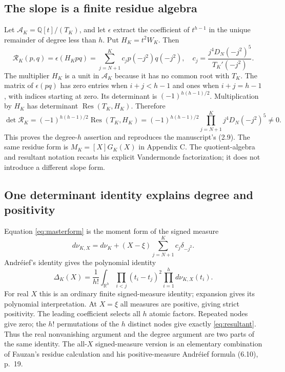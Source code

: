 \documentclass[11pt]{article}
\theoremstyle{definition}
\theoremstyle{remark}\newtheorem*{remark}{Remark}
\newcommand{\Q}{\mathbb Q}
\newcommand{\R}{\mathbb R}
\newcommand{\Res}{\operatorname{Res}}
\newcommand{\rpair}{\mathcal R}
\begin{document}
\subsection{The slope is a finite residue algebra}
Let $\mathcal A_K=\Q[t]/(T_K)$, and let $\epsilon$ extract the coefficient of
$t^{h-1}$ in the unique remainder of degree less than $h$. Put $H_K=t^2W_K$.
Then
\begin{equation}\label{eq:frobenius}
 \rpair_K(p,q)=\epsilon(H_Kpq)
 =\sum_{j=N+1}^K c_jp(-j^2)q(-j^2),\quad
 c_j=\frac{j^4D_N(-j^2)^5}{T_K'(-j^2)}.
\end{equation}
The multiplier $H_K$ is a unit in $\mathcal A_K$ because it has no common root
with $T_K$. The matrix of $\epsilon(pq)$ has zero entries when $i+j<h-1$
and ones when $i+j=h-1$, with indices starting at zero. Its determinant is
$(-1)^{h(h-1)/2}$. Multiplication by $H_K$ has determinant
$\Res(T_K,H_K)$. Therefore
\begin{equation}\label{eq:resultant}
 \det\rpair_K=(-1)^{h(h-1)/2}\Res(T_K,H_K)
 =(-1)^{h(h-1)/2}\prod_{j=N+1}^K j^4D_N(-j^2)^5\ne0.
\end{equation}
This proves the degree-$h$ assertion and reproduces the manuscript's (2.9).
The same residue form is $M_K=[X]G_K(X)$ in Appendix C.
The quotient-algebra and resultant notation recasts his explicit
Vandermonde factorization; it does not introduce a different slope form.

\subsection{One determinant identity explains degree and positivity}
Equation \eqref{eq:masterform} is the moment form of the signed measure
\[
 d\nu_{K,X}=d\nu_K+(X-\xi)\sum_{j=N+1}^K c_j\delta_{-j^2}.
\]
Andr\'eief's identity \cite{Andreief} gives the polynomial identity
\begin{equation}\label{eq:andreief}
 \Delta_K(X)=\frac1{h!}\int_{\R^h}
       \prod_{i<j}(t_i-t_j)^2\prod_{i=1}^h d\nu_{K,X}(t_i).
\end{equation}
For real $X$ this is an ordinary finite signed-measure identity; expansion
gives its polynomial interpretation. At $X=\xi$ all measures are positive,
giving strict positivity. The leading coefficient selects all $h$ atomic
factors. Repeated nodes give zero; the $h!$ permutations of the $h$ distinct
nodes give exactly \eqref{eq:resultant}. Thus the real nonvanishing argument and
the degree argument are two parts of the same identity.
The all-$X$ signed-measure version is an elementary combination of Fauzan's
residue calculation and his positive-measure Andr\'eief formula (6.10), p.~19.
\end{document}
